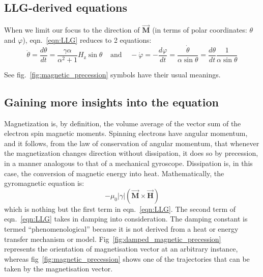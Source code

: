 {		\subsection{LLG-derived equations}
		{
			\vspace{0.25cm}
			\large
			When we limit our focus to the direction of $\overrightarrow{\mathbf{M}}$ (in terms of polar coordinates: $\theta$ and $\varphi$), eqn.~\ref{eqn:LLG} reduces to 2 equations:
			$$\dot{\theta}=\frac{d \theta}{d t}=\frac{\gamma \alpha}{\alpha^{2}+1}H_{\mathrm{z}} \sin \theta \,\,\,\,\,\;\text{and}\,\,\,\,\,\;-\dot{\varphi}=-\frac{d \varphi}{d t}=\frac{\dot{\theta}}{\alpha \sin \theta}=\frac{d \theta}{d t} \frac{1}{\alpha \sin \theta}$$
		
			See fig.~\ref{fig:magnetic_precession} symbols have their usual meanings. ~\cite{Mallinson20001976}
		}

		\subsection{Gaining more insights into the equation}
		{
			\vspace{0.25cm}
			\large
			Magnetization is, by definition, the volume average of the vector sum of the electron spin magnetic moments. Spinning electrons have angular momentum, and it follows, from the law of conservation of angular momentum, that whenever the magnetization changes direction without dissipation, it does so by precession, in a manner analogous to that of a mechanical gyroscope. Dissipation is, in this case, the conversion of magnetic energy into heat. Mathematically, the gyromagnetic equation is:
			$$-\mu_0|\gamma| \left(\overrightarrow{\mathbf{M}} \times \overrightarrow{\mathbf{H}}\right)$$
			which is nothing but the first term in eqn.~\ref{eqn:LLG}.
			\newline
			\newline
			The second term of eqn.~\ref{eqn:LLG} takes in damping into consideration. The damping constant is termed “phenomenological” because it is not derived from a heat or energy transfer mechanism or model.
			\newline
			\newline
			Fig~\ref{fig:damped_magnetic_precession} ~\cite{Mallinson20001976}  represents the orientation of magnetisation vector at an arbitrary instance, whereas fig~\ref{fig:magnetic_precession} shows one of the trajectories that can be taken by the magnetisation vector.

}}
